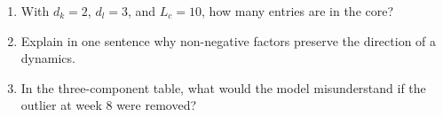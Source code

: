 \begin{selfcheck}
\begin{enumerate}
  \item With $d_k=2$, $d_l=3$, and $L_c=10$, how many entries are in the core?
  \item Explain in one sentence why non-negative factors preserve the direction of a dynamics.
  \item In the three-component table, what would the model misunderstand if the outlier at week 8 were removed?
\end{enumerate}
\end{selfcheck}
